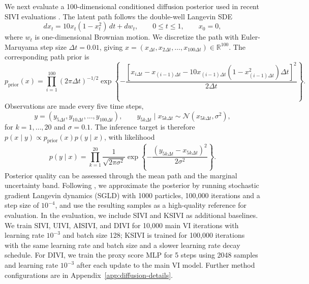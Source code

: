We next evaluate a 100-dimensional conditioned diffusion posterior used in recent SIVI evaluations \citep{cheng2024kernel,pielok2025revisiting}.  The latent path follows the double-well Langevin SDE
\begin{equation}
  dx_t = 10x_t(1 - x_t^2)\,dt + dw_t,
  \qquad 0 \leq t \leq 1,
  \qquad x_0 = 0,
\end{equation}
where $w_t$ is one-dimensional Brownian motion.  We discretize the path with Euler-Maruyama step size $\Delta t=0.01$, giving
$
  x = (x_{\Delta t}, x_{2\Delta t}, \ldots, x_{100\Delta t}) \in \mathbb{R}^{100}.
$
The corresponding path prior is
\begin{equation}
  p_{\mathrm{prior}}(x)
  =
  \prod_{i=1}^{100}(2\pi\Delta t)^{-1/2}
  \exp\left\{
    -\frac{\left[x_{i\Delta t}-x_{(i-1)\Delta t}
      -10x_{(i-1)\Delta t}(1-x_{(i-1)\Delta t}^2)\Delta t\right]^2}
    {2\Delta t}
  \right\}.
\end{equation}
Observations are made every five time steps,
\begin{equation}
  y = (y_{5\Delta t}, y_{10\Delta t}, \ldots, y_{100\Delta t}),
  \qquad
  y_{5k\Delta t} \mid x_{5k\Delta t}
  \sim \mathcal{N}(x_{5k\Delta t}, \sigma^2),
\end{equation}
for $k=1,\ldots,20$ and $\sigma=0.1$.  The inference target is therefore $p(x \mid y) \propto p_{\mathrm{prior}}(x)p(y \mid x)$, with likelihood
\begin{equation}
  p(y \mid x)
  =
  \prod_{k=1}^{20}
  \frac{1}{\sqrt{2\pi\sigma^2}}
  \exp\left\{-\frac{(y_{5k\Delta t}-x_{5k\Delta t})^2}{2\sigma^2}\right\}.
\end{equation}
Posterior quality can be assessed through the mean path and the marginal uncertainty band. Following \citet{cheng2024kernel}, we approximate the posterior by running stochastic gradient Langevin dynamics (SGLD) with 1000 particles, 100,000 iterations and a step size of $10^{-4}$, and use the resulting samples as a high-quality reference for evaluation.
In the evaluation, we include SIVI and KSIVI as additional baselines. We train SIVI, UIVI, AISIVI, and DIVI for 10,000 main VI iterations with learning rate $10^{-3}$ and batch size 128; KSIVI is trained for 100,000 iterations with the same learning rate and batch size and a slower learning rate decay schedule. For DIVI, we train the proxy score MLP for 5 steps using 2048 samples and learning rate $10^{-3}$ after each update to the main VI model. Further method configurations are in Appendix~\ref{app:diffusion-details}.

